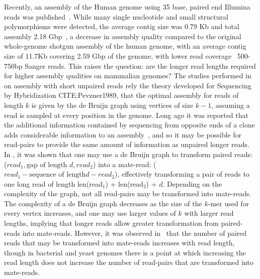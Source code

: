 \documentclass{article}
\begin{document}
Recently, an assembly of the Human genome using 35 base, paired end
Illumina reads was published~\cite{Birol2009}.  While many single
nucleotide and small structural polymorphisms were detected, the
average contig size was 0.79 Kb and total assembly 2.18
Gbp~\cite{Birol2009}, a decrease in assembly quality compared to the
original whole-genome shotgun assembly of the human genome, with an
average contig size of 11.7Kb covering 2.59 Gbp of the genome, with
lower read coverage~\cite{Venter2001} 500-750bp Sanger reads.  This
raises the question: are the longer read lengths required for higher
assembly qualities on mammalian genomes?  The studies performed
in~\cite{Chaisson2004,Whiteford2005} on assembly with short unpaired
reads rely the theory developed for Sequencing by Hybridization
CITE:Pevzner1989, that the optimal assembly for reads of length $k$ is
given by the de Bruijn graph using vertices of size $k-1$, assuming a
read is sampled at every position in the genome.  Long ago it was
reported that the additional information contained by sequencing from
opposite ends of a clone adds considerable information to an
assembly~\cite{Caskey1991}, and so it may be possible for read-pairs
to provide the same amount of information as unpaired longer reads.
In \cite{Pevzner2001db}, it was shown that one may use a de Bruijn
graph to transform paired reads: ($read_1, \textrm{gap of length\ } d,
read_2$) into a mate-read: ($read_1 - \textrm{sequence of length} d -
read_2$), effectively transforming a pair of reads to one long read of
length len(read$_1$) + len(read$_2$) + $d$.  Depending on the
complexity of the graph, not all read-pairs may be transformed into
mate-reads.  The complexity of a de Bruijn graph decreases as the size
of the $k$-mer used for every vertex increases, and one may use larger
values of $k$ with larger read lengths, implying that longer reads
allow greater transformation from paired-reads into mate-reads.
However, it was observed in~\cite{Chaisson2009} that the number of
paired reads that may be transformed into mate-reads increases with
read length, though in bacterial and yeast genomes there is a point at
which increasing the read length does not increase the number of
read-pairs that are transformed into mate-reads.
\end{document}
